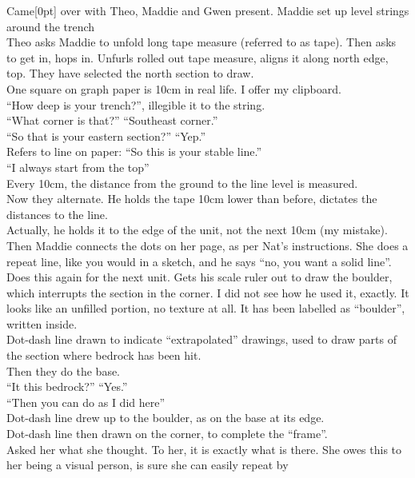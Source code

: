 \documentclass[
]{article}
\newcommand{\paragraphnumber}[1]{\marginnote{\color{lightgray}\tiny{#1}}[0pt]}
\begin{document}
Came\paragraphnumber{[107]} over with Theo, Maddie and Gwen present.
Maddie set up level strings around the trench\\
Theo asks Maddie to unfold long tape measure (referred to as tape). Then
asks to get in, hops in. Unfurls rolled out tape measure, aligns it
along north edge, top. They have selected the north section to draw.\\
One square on graph paper is 10cm in real life. I offer my clipboard.\\
``How deep is your trench?'', illegible it to the string.\\
``What corner is that?'' ``Southeast corner.''\\
``So that is your eastern section?'' ``Yep.''\\
Refers to line on paper: ``So this is your stable line.''\\
``I always start from the top''\\
Every 10cm, the distance from the ground to the line level is
measured.\\
Now they alternate. He holds the tape 10cm lower than before, dictates
the distances to the line.\\
Actually, he holds it to the edge of the unit, not the next 10cm (my
mistake).\\
Then Maddie connects the dots on her page, as per Nat's instructions.
She does a repeat line, like you would in a sketch, and he says ``no,
you want a solid line''.\\
Does this again for the next unit. Gets his scale ruler out to draw the
boulder, which interrupts the section in the corner. I did not see how
he used it, exactly. It looks like an unfilled portion, no texture at
all. It has been labelled as ``boulder'', written inside.\\
Dot-dash line drawn to indicate ``extrapolated'' drawings, used to draw
parts of the section where bedrock has been hit.\\
Then they do the base.\\
``It this bedrock?'' ``Yes.''\\
``Then you can do as I did here''\\
Dot-dash line drew up to the boulder, as on the base at its edge.\\
Dot-dash line then drawn on the corner, to complete the ``frame''.\\
Asked her what she thought. To her, it is exactly what is there. She
owes this to her being a visual person, is sure she can easily repeat by
\end{document}
